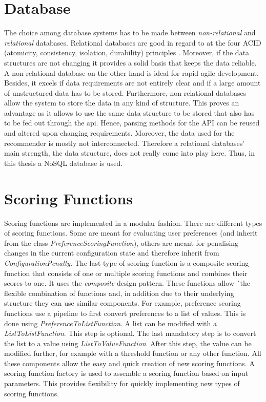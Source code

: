 \section{Database}
\label{sec:DesignImplementation:Database}

The choice among database systems has to be made between \emph{non-relational} and \emph{relational} databases. Relational databases are good in regard to at the four ACID (atomicity, consistency, isolation, durability) principles \cite{chrysanthis1998recovery, cookACIDBASEDatabase2009}. Moreover, if the data structures are not changing it provides a solid basis that keeps the data reliable. A non-relational database on the other hand is ideal for rapid agile development. Besides, it excels if data requirements are not entirely clear and if a large amount of unstructured  data has to be stored. Furthermore, non-relational databases allow the system to store the data in any kind of structure. This proves an advantage as it allows to use the same data structure to be stored that also has to be fed out through the api. Hence, parsing methods for the API can be reused and altered upon changing requirements. Moreover, the data used for the recommender is mostly not interconnected. Therefore a relational databases' main strength, the data structure, does not really come into play here. Thus, in this thesis a NoSQL database is used. 

\section{Scoring Functions}
\label{sec:DesignImplementation:ScroingFunctions}

Scoring functions are implemented in a modular fashion. There are different types of scoring functions. Some are meant for evaluating user preferences (and inherit from the class \emph{PreferenceScoringFunction}), others are meant for penalising changes in the current configuration state and therefore inherit from  \emph{ConfigurationPenalty}. The last type of scoring function is a composite scoring function that consists of one or multiple scoring functions and combines their scores to one. It uses the \emph{composite} design pattern.  These functions allow ´the flexible combination of functions and, in addition due to their underlying structure they can use similar components. For example, preference scoring functions use a pipeline to first convert preferences to a list of values. This is done using \emph{PreferenceToListFunction}. A list can be modified with a \emph{ListToListFunction}. This step is optional. The last mandatory step is to convert the list to a value using \emph{ListToValueFunction}. After this step, the value can be modified further, for example with a threshold function or any other function. All these components allow the easy and quick creation of new scoring functions. A scoring function factory is used to assemble a scoring function based on input parameters. This provides flexibility for quickly implementing new types of scoring functions.


